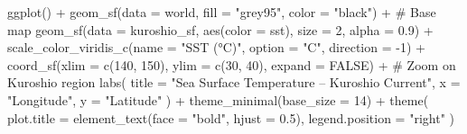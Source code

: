 \documentclass[
  11pt,
]{article}
\newenvironment{Shaded}{\begin{snugshade}}{\end{snugshade}}
\newcommand{\AttributeTok}[1]{\textcolor[rgb]{0.40,0.45,0.13}{#1}}
\newcommand{\CommentTok}[1]{\textcolor[rgb]{0.37,0.37,0.37}{#1}}
\newcommand{\ConstantTok}[1]{\textcolor[rgb]{0.56,0.35,0.01}{#1}}
\newcommand{\DecValTok}[1]{\textcolor[rgb]{0.68,0.00,0.00}{#1}}
\newcommand{\FloatTok}[1]{\textcolor[rgb]{0.68,0.00,0.00}{#1}}
\newcommand{\FunctionTok}[1]{\textcolor[rgb]{0.28,0.35,0.67}{#1}}
\newcommand{\NormalTok}[1]{\textcolor[rgb]{0.00,0.23,0.31}{#1}}
\newcommand{\SpecialCharTok}[1]{\textcolor[rgb]{0.37,0.37,0.37}{#1}}
\newcommand{\StringTok}[1]{\textcolor[rgb]{0.13,0.47,0.30}{#1}}
\begin{document}
\begin{Shaded}
\begin{Highlighting}[]
\FunctionTok{ggplot}\NormalTok{() }\SpecialCharTok{+}
  \FunctionTok{geom\_sf}\NormalTok{(}\AttributeTok{data =}\NormalTok{ world, }\AttributeTok{fill =} \StringTok{"grey95"}\NormalTok{, }\AttributeTok{color =} \StringTok{"black"}\NormalTok{) }\SpecialCharTok{+}  \CommentTok{\# Base map}
  \FunctionTok{geom\_sf}\NormalTok{(}\AttributeTok{data =}\NormalTok{ kuroshio\_sf, }\FunctionTok{aes}\NormalTok{(}\AttributeTok{color =}\NormalTok{ sst), }\AttributeTok{size =} \DecValTok{2}\NormalTok{, }\AttributeTok{alpha =} \FloatTok{0.9}\NormalTok{) }\SpecialCharTok{+}
  \FunctionTok{scale\_color\_viridis\_c}\NormalTok{(}\AttributeTok{name =} \StringTok{"SST (°C)"}\NormalTok{, }\AttributeTok{option =} \StringTok{"C"}\NormalTok{, }\AttributeTok{direction =} \SpecialCharTok{{-}}\DecValTok{1}\NormalTok{) }\SpecialCharTok{+}
  \FunctionTok{coord\_sf}\NormalTok{(}\AttributeTok{xlim =} \FunctionTok{c}\NormalTok{(}\DecValTok{140}\NormalTok{, }\DecValTok{150}\NormalTok{), }\AttributeTok{ylim =} \FunctionTok{c}\NormalTok{(}\DecValTok{30}\NormalTok{, }\DecValTok{40}\NormalTok{), }\AttributeTok{expand =} \ConstantTok{FALSE}\NormalTok{) }\SpecialCharTok{+}  \CommentTok{\# Zoom on Kuroshio region}
  \FunctionTok{labs}\NormalTok{(}
    \AttributeTok{title =} \StringTok{"Sea Surface Temperature – Kuroshio Current"}\NormalTok{,}
    \AttributeTok{x =} \StringTok{"Longitude"}\NormalTok{, }\AttributeTok{y =} \StringTok{"Latitude"}
\NormalTok{  ) }\SpecialCharTok{+}
  \FunctionTok{theme\_minimal}\NormalTok{(}\AttributeTok{base\_size =} \DecValTok{14}\NormalTok{) }\SpecialCharTok{+}
  \FunctionTok{theme}\NormalTok{(}
    \AttributeTok{plot.title =} \FunctionTok{element\_text}\NormalTok{(}\AttributeTok{face =} \StringTok{"bold"}\NormalTok{, }\AttributeTok{hjust =} \FloatTok{0.5}\NormalTok{),}
    \AttributeTok{legend.position =} \StringTok{"right"}
\NormalTok{  )}
\end{Highlighting}
\end{Shaded}
\end{document}
